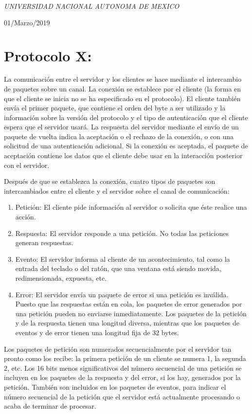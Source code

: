 \documentclass[a4paper, 11pt, oneside]{article}
\begin{document}
\begin{titlepage}
	\textit{UNIVERSIDAD NACIONAL AUTONOMA DE MEXICO} 
	
	\vfill
	
	
	
	
	\vspace{0.3\baselineskip} 
	
	01/Marzo/2019 
	
	 

\end{titlepage}
\section*{Protocolo X:}
La comunicación entre el servidor y los clientes se hace mediante el intercambio de paquetes sobre un canal. La conexión se establece por el cliente (la forma en que el cliente se inicia no se ha especificado en el protocolo). El cliente también envía el primer paquete, que contiene el orden del byte a ser utilizado y la información sobre la versión del protocolo y el tipo de autenticación que el cliente espera que el servidor usará. La respuesta del servidor mediante el envío de un paquete de vuelta indica la aceptación o el rechazo de la conexión, o con una solicitud de una autenticación adicional. Si la conexión es aceptada, el paquete de aceptación contiene los datos que el cliente debe usar en la interacción posterior con el servidor.

Después de que se establezca la conexión, cuatro tipos de paquetes son intercambiados entre el cliente y el servidor sobre el canal de comunicación:
\begin{enumerate}
    \item Petición: El cliente pide información al servidor o solicita que éste realice una acción.
    \item Respuesta: El servidor responde a una petición. No todas las peticiones generan respuestas.
    \item Evento: El servidor informa al cliente de un acontecimiento, tal como la entrada del teclado o del ratón, que una ventana está siendo movida, redimensionada, expuesta, etc.
    \item Error: El servidor envía un paquete de error si una petición es inválida. Puesto que las respuestas están en cola, los paquetes de error generados por una petición pueden no enviarse inmediatamente.
    Los paquetes de la petición y de la respuesta tienen una longitud diversa, mientras que los paquetes de eventos y de error tienen una longitud fija de 32 bytes.

    
\end{enumerate}
Los paquetes de petición son numerados secuencialmente por el servidor tan pronto como los recibe: la primera petición de un cliente se numera 1, la segunda 2, etc. Los 16 bits menos significativos del número secuencial de una petición se incluyen en los paquetes de la respuesta y del error, si los hay, generados por la petición. También son incluidos en los paquetes de eventos, para indicar el número secuencial de la petición que el servidor está actualmente procesando o acaba de terminar de procesar.
\end{document}
